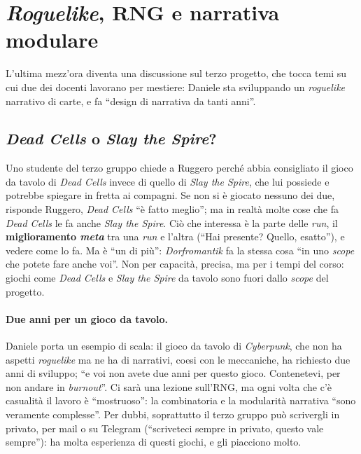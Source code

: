 \section{\emph{Roguelike}, RNG e narrativa modulare}
\label{a11:sec:rng}

L'ultima mezz'ora diventa una discussione sul terzo progetto, che tocca temi su cui due
dei docenti lavorano per mestiere: Daniele sta sviluppando un \emph{roguelike} narrativo
di carte, e fa ``design di narrativa da tanti anni''.

\subsection{\emph{Dead Cells} o \emph{Slay the Spire}?}

Uno studente del terzo gruppo chiede a Ruggero perché abbia consigliato il gioco da
tavolo di \emph{Dead Cells} invece di quello di \emph{Slay the Spire}, che lui possiede e
potrebbe spiegare in fretta ai compagni. Se non si è giocato nessuno dei due, risponde
Ruggero, \emph{Dead Cells} ``è fatto meglio''; ma in realtà molte cose che fa \emph{Dead
Cells} le fa anche \emph{Slay the Spire}. Ciò che interessa è la parte delle \emph{run},
il \textbf{miglioramento \emph{meta}} tra una \emph{run} e l'altra (``Hai presente? Quello,
esatto''), e vedere come lo fa. Ma è ``un di più'': \emph{Dorfromantik} fa la stessa cosa
``in uno \emph{scope} che potete fare anche voi''. Non per capacità, precisa, ma per i
tempi del corso: giochi come \emph{Dead Cells} e \emph{Slay the Spire} da tavolo sono fuori
dallo \emph{scope} del progetto.

\paragraph{Due anni per un gioco da tavolo.} Daniele porta un esempio di scala: il gioco
da tavolo di \emph{Cyberpunk}, che non ha aspetti \emph{roguelike} ma ne ha di narrativi,
coesi con le meccaniche, ha richiesto due anni di sviluppo; ``e voi non avete due anni per
questo gioco. Contenetevi, per non andare in \emph{burnout}''. Ci sarà una lezione
sull'RNG, ma ogni volta che c'è casualità il lavoro è ``mostruoso'': la combinatoria e la
modularità narrativa ``sono veramente complesse''. Per dubbi, soprattutto il terzo gruppo
può scrivergli in privato, per mail o su Telegram (``scriveteci sempre in privato, questo
vale sempre''): ha molta esperienza di questi giochi, e gli piacciono molto.

